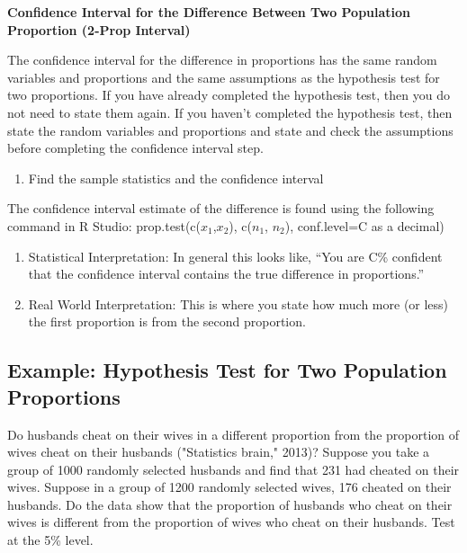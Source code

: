 \documentclass[]{book}
\providecommand{\tightlist}{%
  \setlength{\itemsep}{0pt}\setlength{\parskip}{0pt}}
\begin{document}
\textbf{Confidence Interval for the Difference Between Two Population Proportion (2-Prop Interval)}

The confidence interval for the difference in proportions has the same random variables and proportions and the same assumptions as the hypothesis test for two proportions. If you have already completed the hypothesis test, then you do not need to state them again. If you haven't completed the hypothesis test, then state the random variables and proportions and state and check the assumptions before completing the confidence interval step.

\begin{enumerate}
\def\labelenumi{\arabic{enumi}.}
\tightlist
\item
  Find the sample statistics and the confidence interval
\end{enumerate}

The confidence interval estimate of the difference is found using the following command in R Studio: prop.test(c(\(x_1\),\(x_2\)), c(\(n_1\), \(n_2\)), conf.level=C as a decimal)

\begin{enumerate}
\def\labelenumi{\arabic{enumi}.}
\setcounter{enumi}{1}
\item
  Statistical Interpretation: In general this looks like, ``You are C\% confident that the confidence interval contains the true difference in proportions.''
\item
  Real World Interpretation: This is where you state how much more (or less) the first proportion is from the second proportion.
\end{enumerate}

\hypertarget{example-hypothesis-test-for-two-population-proportions}{%
\subsection{Example: Hypothesis Test for Two Population Proportions}\label{example-hypothesis-test-for-two-population-proportions}}

Do husbands cheat on their wives in a different proportion from the proportion of wives cheat on their husbands ("Statistics brain," 2013)? Suppose you take a group of 1000 randomly selected husbands and find that 231 had cheated on their wives. Suppose in a group of 1200 randomly selected wives, 176 cheated on their husbands. Do the data show that the proportion of husbands who cheat on their wives is different from the proportion of wives who cheat on their husbands. Test at the 5\% level.
\end{document}
